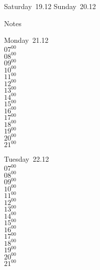 \documentclass[11pt,a4paper]{book}\usepackage[]{graphicx}\usepackage[]{color}
\begin{document}
\begin{weekendbox}
  Saturday~19.12
  \tcblower
  Sunday~20.12
\end{weekendbox} %
\begin{notebox}
  Notes
\end{notebox}
\clearpage
\begin{headerbox}
\end{headerbox}
\begin{weekdaybox}
  Monday~21.12\\
  { 
  \vfill
  $07^{00}$\\
$08^{00}$\\
$09^{00}$\\
$10^{00}$\\
$11^{00}$\\
$12^{00}$\\
$13^{00}$\\
$14^{00}$\\
$15^{00}$\\
$16^{00}$\\
$17^{00}$\\
$18^{00}$\\
$19^{00}$\\
$20^{00}$\\
$21^{00}$\\
  }
\end{weekdaybox}
\begin{weekdaybox}
  Tuesday~22.12\\
  { 
  \vfill
  $07^{00}$\\
$08^{00}$\\
$09^{00}$\\
$10^{00}$\\
$11^{00}$\\
$12^{00}$\\
$13^{00}$\\
$14^{00}$\\
$15^{00}$\\
$16^{00}$\\
$17^{00}$\\
$18^{00}$\\
$19^{00}$\\
$20^{00}$\\
$21^{00}$\\
  }
\end{weekdaybox}
\end{document}

